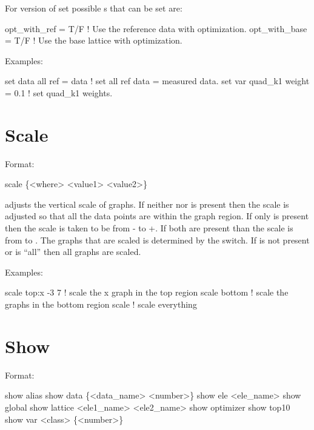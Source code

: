 For  version of set possible 
s that can be set are:
\begin{example}
  opt\_with\_ref  = T/F ! Use the reference data with optimization.
  opt\_with\_base = T/F ! Use the base lattice with optimization.
\end{example}

Examples:
\begin{example}
  set data all ref = data       ! set all ref data = measured data.
  set var quad\_k1 weight = 0.1 ! set quad\_k1 weights. 
\end{example}

\section{Scale}
\label{s:scale}

Format:
\begin{example}
  scale \{<where> <value1> <value2>\}
\end{example}

\vskip 0.2in  adjusts the vertical scale of graphs. If
neither  nor  is present then the scale is
adjusted so that all the data points are within the graph region.  If
only  is present then the scale is taken to be from
- to +. If both are present than the scale
is from  to .  The graphs that are scaled
is determined by the  switch. If  is not
present  or  is ``all'' then all graphs are scaled. 

Examples:
\begin{example}
  scale top:x -3  7  ! scale the x graph in the top region
  scale bottom       ! scale the graphs in the bottom region
  scale              ! scale everything
\end{example}


\section{Show}
\label{s:show}

Format:
\begin{example}
  show alias                     
  show data \{<data_name> <number>\} 
  show ele <ele_name>
  show global
  show lattice <ele1_name> <ele2_name>
  show optimizer
  show top10
  show var <class> \{<number>\}
\end{example}

